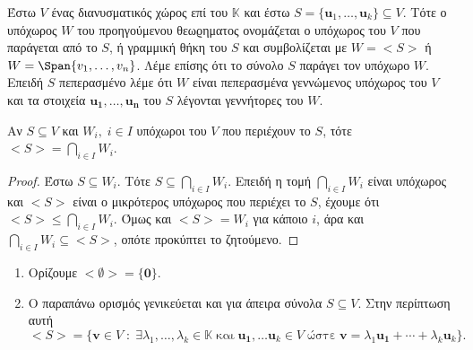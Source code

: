 \begin{dfn}
    Έστω $ V $ ένας διανυσματικός χώρος επί του $ \mathbb{K} $ και έστω $ S = 
    \{ \mathbf{u}_{1}, \ldots, \mathbf{u}_{k} \} \subseteq V$. Τότε ο υπόχωρος $ W $ 
    του προηγούμενου θεωϱηματος ονομάζεται ο υπόχωρος του $V$ που 
    \textcolor{Col2}{παράγεται} από το $ S $, ή γραμμική θήκη του $S$ και 
    συμβολίζεται με $ W = < S > $ ή $ W = \Span \{ v_{1},\ldots,v_{n}  \}  $.  
    Λέμε επίσης ότι το σύνολο $S$ \textcolor{Col2}{παράγει} τον υπόχωρο $W$. 
    Επειδή $S$  πεπερασμένο λέμε ότι $W$ είναι \textcolor{Col2}{πεπερασμένα 
    γεννώμενος} υπόχωρος του  $V$ και τα στοιχεία 
    $ \mathbf{u_{1}}, \ldots, \mathbf{u_{n}} $ του $S$ λέγονται 
    \textcolor{Col2}{γεννήτορες} του $W$.
\end{dfn}

\begin{prop}
\item {}
    Αν $ S \subseteq V $ και $ W_{i}, \; i \in I $ 
    υπόχωροι του $V$ που περιέχουν το $S$, τότε $ < S > = \bigcap_{i \in I} W_{i} $. 
\end{prop}
\begin{proof}
\item {}
    Έστω $ S \subseteq W_{i} $. Τότε $ S \subseteq \bigcap_{i \in I} W_{i} $. Επειδή 
    η τομή $  \bigcap_{i \in I} W_{i} $ είναι υπόχωρος και $ < S >  $ είναι ο 
    μικρότερος υπόχωρος που περιέχει το $S$, έχουμε ότι 
    $ < S > \leq \bigcap_{i \in I} W_{i}   $. Όμως και $ < S > = W_{i}  $ για κάποιο 
    $i$, άρα και $ \bigcap_{i \in Ι} W_{i} \subseteq < S >  $, οπότε προκύπτει το 
    ζητούμενο.
\end{proof}

\begin{rem}
\item {}
    \begin{enumerate}
        \item Ορίζουμε $ < \emptyset > = \{ \mathbf{0} \}  $. 
        \item Ο παραπάνω ορισμός γενικεύεται και για άπειρα σύνολα $ S \subseteq V $. 
            Στην περίπτωση αυτή 
            \[ 
                < S > = \{ \mathbf{v} \in V \; : \; \exists \lambda _{1}, 
                    \ldots, \lambda _{k} \in \mathbb{K} \; \text{και} \; 
                    \mathbf{u_{1}}, \ldots \mathbf{u}_{k} \in V \; 
                    \text{ώστε} \; \mathbf{v} = \lambda _{1} \mathbf{u_{1}} + 
                \cdots + \lambda _{k} \mathbf{u}_{k}\}.
            \]
    \end{enumerate}
\end{rem}


